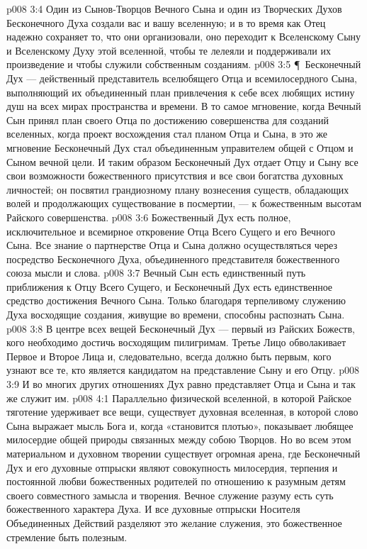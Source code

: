 \vs p008 3:4 Один из Сынов\hyp{}Творцов Вечного Сына и один из Творческих Духов Бесконечного Духа создали вас и вашу вселенную; и в то время как Отец надежно сохраняет то, что они организовали, оно переходит к Вселенскому Сыну и Вселенскому Духу этой вселенной, чтобы те лелеяли и поддерживали их произведение и чтобы служили собственным созданиям.
\vs p008 3:5 \P\ Бесконечный Дух --- действенный представитель вселюбящего Отца и всемилосердного Сына, выполняющий их объединенный план привлечения к себе всех любящих истину душ на всех мирах пространства и времени. В то самое мгновение, когда Вечный Сын принял план своего Отца по достижению совершенства для созданий вселенных, когда проект восхождения стал планом Отца и Сына, в это же мгновение Бесконечный Дух стал объединенным управителем общей с Отцом и Сыном вечной цели. И таким образом Бесконечный Дух отдает Отцу и Сыну все свои возможности божественного присутствия и все свои богатства духовных личностей; он посвятил  грандиозному плану вознесения существ, обладающих волей и продолжающих существование в посмертии, --- к божественным высотам Райского совершенства.
\vs p008 3:6 Божественный Дух есть полное, исключительное и всемирное откровение Отца Всего Сущего и его Вечного Сына. Все знание о партнерстве Отца и Сына должно осуществляться через посредство Бесконечного Духа, объединенного представителя божественного союза мысли и слова.
\vs p008 3:7 Вечный Сын есть единственный путь приближения к Отцу Всего Сущего, и Бесконечный Дух есть единственное средство достижения Вечного Сына. Только благодаря терпеливому служению Духа восходящие создания, живущие во времени, способны распознать Сына.
\vs p008 3:8 В центре всех вещей Бесконечный Дух --- первый из Райских Божеств, кого необходимо достичь восходящим пилигримам. Третье Лицо обволакивает Первое и Второе Лица и, следовательно, всегда должно быть первым, кого узнают все те, кто является кандидатом на представление Сыну и его Отцу.
\vs p008 3:9 И во многих других отношениях Дух равно представляет Отца и Сына и так же служит им.
\vs p008 4:1 Параллельно физической вселенной, в которой Райское тяготение удерживает все вещи, существует духовная вселенная, в которой слово Сына выражает мысль Бога и, когда «становится плотью», показывает любящее милосердие общей природы связанных между собою Творцов. Но во всем этом материальном и духовном творении существует огромная арена, где Бесконечный Дух и его духовные отпрыски являют совокупность милосердия, терпения и постоянной любви божественных родителей по отношению к разумным детям своего совместного замысла и творения. Вечное служение разуму есть суть божественного характера Духа. И все духовные отпрыски Носителя Объединенных Действий разделяют это желание служения, это божественное стремление быть полезным.
